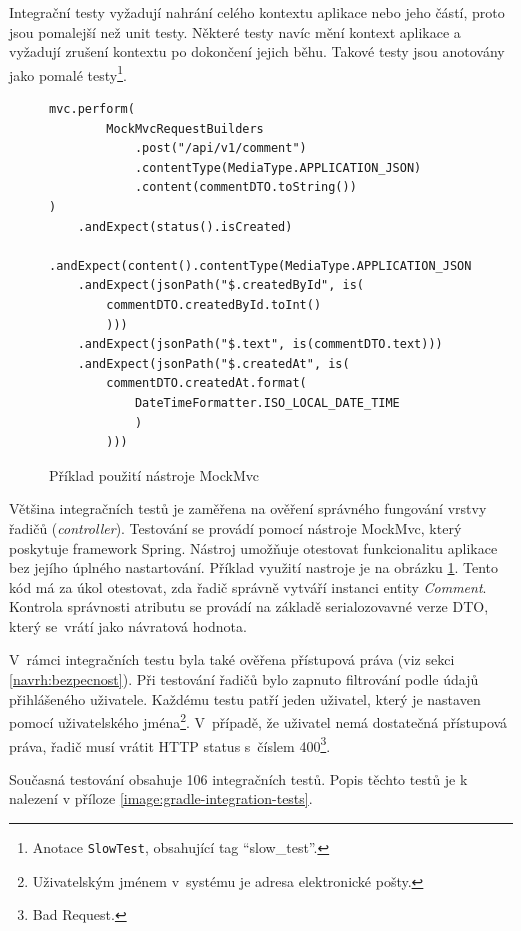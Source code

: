     Integrační testy vyžadují nahrání celého kontextu aplikace nebo jeho částí, proto jsou pomalejší než unit testy. Některé testy navíc mění kontext aplikace a vyžadují zrušení kontextu po dokončení jejich běhu. Takové testy jsou anotovány jako pomalé testy\footnote{Anotace \texttt{SlowTest}, obsahující tag \enquote{slow\_test}.}.
    
        \begin{figure}
        \begin{verbatim}
mvc.perform(
        MockMvcRequestBuilders
            .post("/api/v1/comment")
            .contentType(MediaType.APPLICATION_JSON)
            .content(commentDTO.toString())
)
    .andExpect(status().isCreated)
    .andExpect(content().contentType(MediaType.APPLICATION_JSON))
    .andExpect(jsonPath("$.createdById", is(
        commentDTO.createdById.toInt()
        )))
    .andExpect(jsonPath("$.text", is(commentDTO.text)))
    .andExpect(jsonPath("$.createdAt", is(
        commentDTO.createdAt.format(
            DateTimeFormatter.ISO_LOCAL_DATE_TIME
            )
        )))

        \end{verbatim}
        \caption{Příklad použití nástroje MockMvc} 
        \label{code:mockmvc}
    \end{figure}
    Většina integračních testů je zaměřena na ověření správného fungování vrstvy řadičů (\textit{controller}). Testování se provádí pomocí nástroje MockMvc, který poskytuje framework Spring.\cite{mock-mvc} Nástroj umožňuje otestovat funkcionalitu aplikace bez jejího úplného nastartování. Příklad využití nastroje je na obrázku \ref{code:mockmvc}. Tento kód má za úkol otestovat, zda řadič správně vytváří instanci entity \textit{Comment}. Kontrola správnosti atributu se provádí na základě serialozovavné verze DTO, který se~vrátí jako návratová hodnota.
    
    V~rámci integračních testu byla také ověřena přístupová práva (viz sekci \ref{navrh:bezpecnost}). Při testování řadičů bylo zapnuto filtrování podle údajů přihlášeného uživatele. Každému testu patří jeden uživatel, který je nastaven pomocí uživatelského jména\footnote{Uživatelským jménem v~systému je adresa elektronické pošty.}. V~případě, že uživatel nemá dostatečná přístupová práva, řadič musí vrátit HTTP status s~číslem 400\footnote{Bad Request.}.
    
     Současná testování obsahuje 106 integračních testů. Popis těchto testů je k nalezení v příloze \ref{image:gradle-integration-tests}.
    
